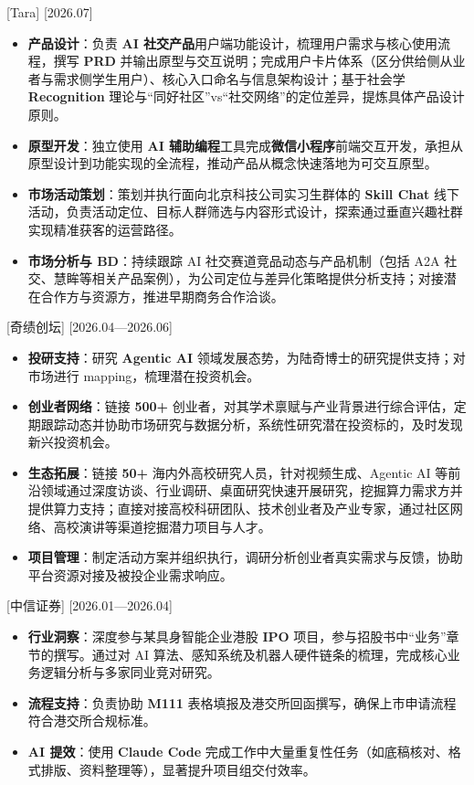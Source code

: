 \documentclass{resume}
\begin{document}
[Tara]
[2026.07]
\begin{itemize}
  \item \textbf{产品设计}：负责 \textbf{AI 社交产品}用户端功能设计，梳理用户需求与核心使用流程，撰写 \textbf{PRD} 并输出原型与交互说明；完成用户卡片体系（区分供给侧从业者与需求侧学生用户）、核心入口命名与信息架构设计；基于社会学 \textbf{Recognition} 理论与“同好社区”vs“社交网络”的定位差异，提炼具体产品设计原则。
  \item \textbf{原型开发}：独立使用 \textbf{AI 辅助编程}工具完成\textbf{微信小程序}前端交互开发，承担从原型设计到功能实现的全流程，推动产品从概念快速落地为可交互原型。
  \item \textbf{市场活动策划}：策划并执行面向北京科技公司实习生群体的 \textbf{Skill Chat} 线下活动，负责活动定位、目标人群筛选与内容形式设计，探索通过垂直兴趣社群实现精准获客的运营路径。
  \item \textbf{市场分析与 BD}：持续跟踪 AI 社交赛道竞品动态与产品机制（包括 A2A 社交、慧眸等相关产品案例），为公司定位与差异化策略提供分析支持；对接潜在合作方与资源方，推进早期商务合作洽谈。
\end{itemize}

[奇绩创坛]
[2026.04—2026.06]
\begin{itemize}
  \item \textbf{投研支持}：研究 \textbf{Agentic AI} 领域发展态势，为陆奇博士的研究提供支持；对市场进行 mapping，梳理潜在投资机会。
  \item \textbf{创业者网络}：链接 \textbf{500+} 创业者，对其学术禀赋与产业背景进行综合评估，定期跟踪动态并协助市场研究与数据分析，系统性研究潜在投资标的，及时发现新兴投资机会。
  \item \textbf{生态拓展}：链接 \textbf{50+} 海内外高校研究人员，针对视频生成、Agentic AI 等前沿领域通过深度访谈、行业调研、桌面研究快速开展研究，挖掘算力需求方并提供算力支持；直接对接高校科研团队、技术创业者及产业专家，通过社区网络、高校演讲等渠道挖掘潜力项目与人才。
  \item \textbf{项目管理}：制定活动方案并组织执行，调研分析创业者真实需求与反馈，协助平台资源对接及被投企业需求响应。
\end{itemize}

[中信证券]
[2026.01—2026.04]
\begin{itemize}
  \item \textbf{行业洞察}：深度参与某具身智能企业港股 \textbf{IPO} 项目，参与招股书中“业务”章节的撰写。通过对 AI 算法、感知系统及机器人硬件链条的梳理，完成核心业务逻辑分析与多家同业竞对研究。
  \item \textbf{流程支持}：负责协助 \textbf{M111} 表格填报及港交所回函撰写，确保上市申请流程符合港交所合规标准。
  \item \textbf{AI 提效}：使用 \textbf{Claude Code} 完成工作中大量重复性任务（如底稿核对、格式排版、资料整理等），显著提升项目组交付效率。
\end{itemize}
\end{document}
